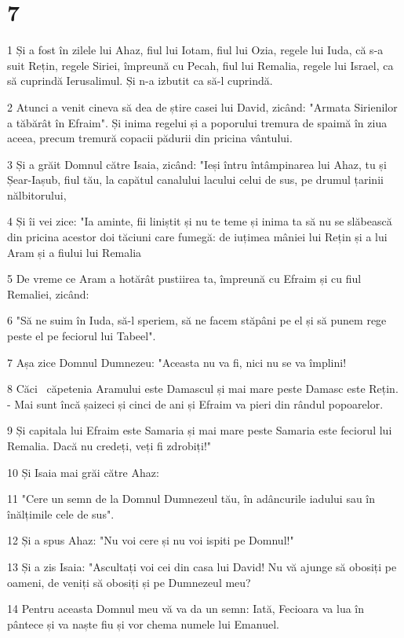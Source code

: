 \chapter{7}

\par 1 Și a fost în zilele lui Ahaz, fiul lui Iotam, fiul lui Ozia, regele lui Iuda, că s-a suit Rețin, regele Siriei, împreună cu Pecah, fiul lui Remalia, regele lui Israel, ca să cuprindă Ierusalimul. Și n-a izbutit ca să-l cuprindă.
\par 2 Atunci a venit cineva să dea de știre casei lui David, zicând: "Armata Sirienilor a tăbărât în Efraim". Și inima regelui și a poporului tremura de spaimă în ziua aceea, precum tremură copacii pădurii din pricina vântului.
\par 3 Și a grăit Domnul către Isaia, zicând: "Ieși întru întâmpinarea lui Ahaz, tu și Șear-Iașub, fiul tău, la capătul canalului lacului celui de sus, pe drumul țarinii nălbitorului,
\par 4 Și îi vei zice: "Ia aminte, fii liniștit și nu te teme și inima ta să nu se slăbească din pricina acestor doi tăciuni care fumegă: de iuțimea mâniei lui Rețin și a lui Aram și a fiului lui Remalia
\par 5 De vreme ce Aram a hotărât pustiirea ta, împreună cu Efraim și cu fiul Remaliei, zicând:
\par 6 "Să ne suim în Iuda, să-l speriem, să ne facem stăpâni pe el și să punem rege peste el pe feciorul lui Tabeel".
\par 7 Așa zice Domnul Dumnezeu: "Aceasta nu va fi, nici nu se va împlini!
\par 8 Căci  căpetenia Aramului este Damascul și mai mare peste Damasc este Rețin. - Mai sunt încă șaizeci și cinci de ani și Efraim va pieri din rândul popoarelor.
\par 9 Și capitala lui Efraim este Samaria și mai mare peste Samaria este feciorul lui Remalia. Dacă nu credeți, veți fi zdrobiți!"
\par 10 Și Isaia mai grăi către Ahaz:
\par 11 "Cere un semn de la Domnul Dumnezeul tău, în adâncurile iadului sau în înălțimile cele de sus".
\par 12 Și a spus Ahaz: "Nu voi cere și nu voi ispiti pe Domnul!"
\par 13 Și a zis Isaia: "Ascultați voi cei din casa lui David! Nu vă ajunge să obosiți pe oameni, de veniți să obosiți și pe Dumnezeul meu?
\par 14 Pentru aceasta Domnul meu vă va da un semn: Iată, Fecioara va lua în pântece și va naște fiu și vor chema numele lui Emanuel.
